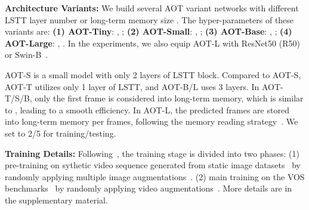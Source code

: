 \documentclass{article}
\begin{document}
\noindent\textbf{Architecture Variants:} We build several AOT variant networks with different LSTT layer number  or long-term memory size . The hyper-parameters of these variants are: \textbf{(1) AOT-Tiny}: , ; \textbf{(2) AOT-Small}: , ; \textbf{(3) AOT-Base}: , ; \textbf{(4) AOT-Large}: , . In the experiments, we also equip AOT-L with ResNet50 (R50)~\cite{resnet} or Swin-B~\cite{swin}.

AOT-S is a small model with only 2 layers of LSTT block. Compared to AOT-S, AOT-T utilizes only 1 layer of LSTT, and AOT-B/L uses 3 layers. In AOT-T/S/B, only the first frame is considered into long-term memory, which is similar to \cite{feelvos,cfbi}, leading to a smooth efficiency. In AOT-L, the predicted frames are stored into long-term memory per  frames, following the memory reading strategy~\cite{spacetime}. We set  to 2/5 for training/testing.

\noindent\textbf{Training Details:} Following~\cite{rgmp,spacetime,EGMN,KMN}, the training stage is divided into two phases: (1) pre-training on sythetic video sequence generated from static image datasets~\cite{voc,coco,cheng2014global,shi2015hierarchical,semantic} by randomly applying multiple image augmentations~\cite{rgmp}. (2) main training on the VOS benchmarks~\cite{youtubevos,davis2017} by randomly applying video augmentations~\cite{cfbi}. 
More details are in the supplementary material.
\end{document}
